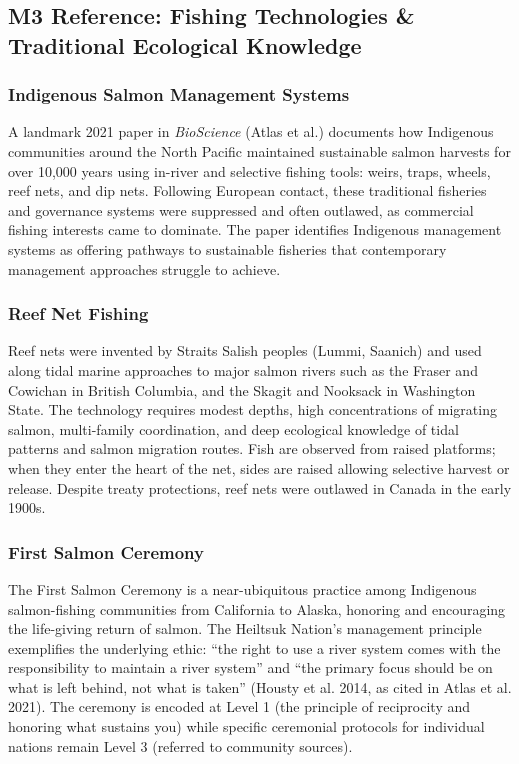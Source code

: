 \documentclass[11pt,letterpaper]{article}
\begin{document}
\subsection{M3 Reference: Fishing Technologies \& Traditional Ecological Knowledge}

\subsubsection{Indigenous Salmon Management Systems}

A landmark 2021 paper in \textit{BioScience} (Atlas et al.) documents how Indigenous communities around the North Pacific maintained sustainable salmon harvests for over 10,000 years using in-river and selective fishing tools: weirs, traps, wheels, reef nets, and dip nets. Following European contact, these traditional fisheries and governance systems were suppressed and often outlawed, as commercial fishing interests came to dominate. The paper identifies Indigenous management systems as offering pathways to sustainable fisheries that contemporary management approaches struggle to achieve.

\subsubsection{Reef Net Fishing}

Reef nets were invented by Straits Salish peoples (Lummi, Saanich) and used along tidal marine approaches to major salmon rivers such as the Fraser and Cowichan in British Columbia, and the Skagit and Nooksack in Washington State. The technology requires modest depths, high concentrations of migrating salmon, multi-family coordination, and deep ecological knowledge of tidal patterns and salmon migration routes. Fish are observed from raised platforms; when they enter the heart of the net, sides are raised allowing selective harvest or release. Despite treaty protections, reef nets were outlawed in Canada in the early 1900s.

\subsubsection{First Salmon Ceremony}

The First Salmon Ceremony is a near-ubiquitous practice among Indigenous salmon-fishing communities from California to Alaska, honoring and encouraging the life-giving return of salmon. The Heiltsuk Nation's management principle exemplifies the underlying ethic: ``the right to use a river system comes with the responsibility to maintain a river system'' and ``the primary focus should be on what is left behind, not what is taken'' (Housty et al. 2014, as cited in Atlas et al. 2021). The ceremony is encoded at Level 1 (the principle of reciprocity and honoring what sustains you) while specific ceremonial protocols for individual nations remain Level 3 (referred to community sources).
\end{document}

